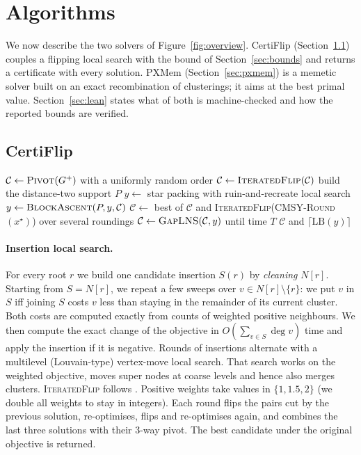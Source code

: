 \documentclass[11pt]{article}
\theoremstyle{definition}
\newcommand{\LB}{\mathrm{LB}}
\begin{document}
\section{Algorithms}\label{sec:algos}

We now describe the two solvers of Figure~\ref{fig:overview}.  CertiFlip
(Section~\ref{sec:algo}) couples a flipping local search with the bound of
Section~\ref{sec:bounds} and returns a certificate with every solution.
PXMem (Section~\ref{sec:pxmem}) is a memetic solver built on an exact
recombination of clusterings; it aims at the best primal value.
Section~\ref{sec:lean} states what of both is machine-checked and how the
reported bounds are verified.

\subsection{CertiFlip}\label{sec:algo}

\begin{algorithm}[t]
\caption{CertiFlip$(G^+,T)$}\label{alg:certiflip}
\begin{algorithmic}[1]
\State $\mathcal C\gets\textsc{Pivot}(G^+)$ with a uniformly random order
\State $\mathcal C\gets\textsc{IteratedFlip}(\mathcal C)$ 
\State build the distance-two support $P$
\State $y\gets$ star packing with ruin-and-recreate local search 
\State $y\gets\textsc{BlockAscent}(P,y,\mathcal C)$ 
  \State $\mathcal C\gets$ best of $\mathcal C$ and \textsc{IteratedFlip}(\textsc{CMSY-Round}$(x^\star)$) over several roundings
\EndIf
\State $\mathcal C\gets\textsc{GapLNS}(\mathcal C,y)$ until time $T$
\State \Return $\mathcal C$ and $\lceil\LB(y)\rceil$ 
\end{algorithmic}
\end{algorithm}

\paragraph{Insertion local search.}  For every root $r$ we build one candidate
insertion $S(r)$ by \emph{cleaning} $N[r]$.  Starting from $S=N[r]$, we
repeat a few sweeps over $v\in N[r]\setminus\{r\}$: we put $v$ in $S$ iff
joining $S$ costs $v$ less than staying in the remainder of its current
cluster.  Both costs are computed exactly from counts of weighted positive
neighbours.  We then compute the exact change of the objective in
$O(\sum_{v\in S}\deg v)$ time and apply the insertion if it is negative.
Rounds of insertions alternate with a multilevel (Louvain-type) vertex-move
local search.  That search works on the weighted objective, moves super nodes
at coarse levels and hence also merges clusters.  \textsc{IteratedFlip}
follows \citet{CohenAddadLPTYZ24}.  Positive weights take values in
$\{1,1.5,2\}$ (we double all weights to stay in integers).  Each round flips
the pairs cut by the previous solution, re-optimises, flips and re-optimises
again, and combines the last three solutions with their $3$-way pivot.  The
best candidate under the original objective is returned.
\end{document}
